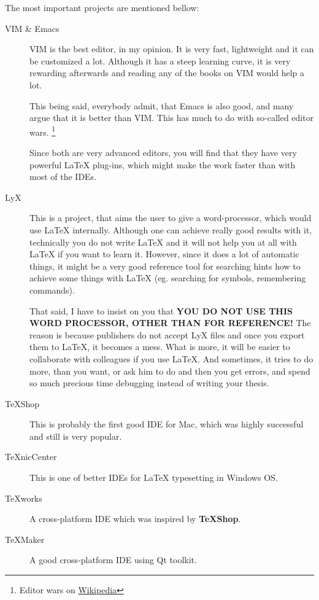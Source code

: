 \documentclass[a4paper]{article}
\begin{document}
The most important projects are mentioned bellow:
\begin{description}
    \item[VIM \& Emacs] VIM is the best editor, in my opinion. It is very fast,
        lightweight and it can be customized a lot. Although it has a steep
        learning curve, it is very rewarding afterwards and reading any of the
        books on VIM would help a lot. 
        
        This being said, everybody admit, that Emacs is also good, and many
        argue that it is better than VIM. This has much to do with so-called
        editor wars.
        \footnote{Editor wars on
        \href{http://en.wikipedia.org/wiki/Editor_war}{Wikipedia}}

        Since both are very advanced editors, you will find that they have very
        powerful \LaTeX{} plug-ins, which might make the work faster than with
        most of the IDEs.

    \item[LyX] This is a project, that aims the user to give a word-processor,
        which would use \LaTeX{} internally. Although one can achieve really good
        results with it, technically you do not write \LaTeX{} and it will not
        help you at all with \LaTeX{} if you want to learn it. However, since it
        does a lot of automatic things, it might be a very good reference tool
        for searching hints how to achieve some things with \LaTeX{} (eg.
        searching for symbols, remembering commands). 
        
        That said, I have to insist on you that {\bfseries YOU DO NOT USE THIS
        WORD PROCESSOR, OTHER THAN FOR REFERENCE!} The reason is because
        publishers do not accept LyX files and once you export them to \LaTeX{},
        it becomes a mess. What is more, it will be easier to collaborate with
        colleagues if you use \LaTeX{}. And sometimes, it tries to do more, than
        you want, or ask him to do and then you get errors, and spend so much
        precious time debugging instead of writing your thesis.

    \item[TeXShop] This is probably the first good IDE for Mac, which was highly
        successful and still is very popular.

    \item[TeXnicCenter] This is one of better IDEs for \LaTeX{} typesetting in
        Windows OS. 

    \item[TeXworks] A cross-platform IDE which was inspired by \textbf{TeXShop}.

    \item[TeXMaker] A good cross-platform IDE using Qt toolkit.
\end{description}
\end{document}
